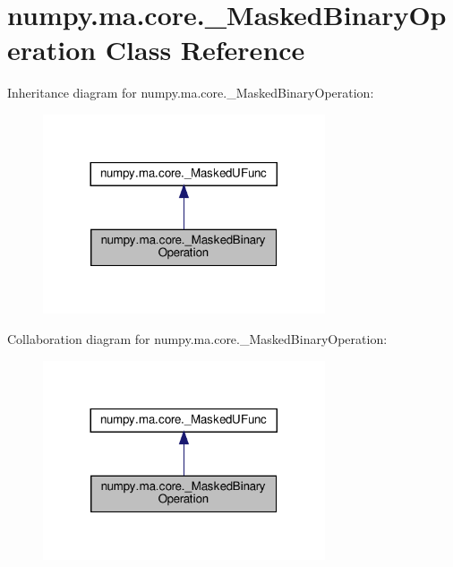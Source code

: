 \hypertarget{classnumpy_1_1ma_1_1core_1_1__MaskedBinaryOperation}{}\section{numpy.\+ma.\+core.\+\_\+\+Masked\+Binary\+Operation Class Reference}
\label{classnumpy_1_1ma_1_1core_1_1__MaskedBinaryOperation}


Inheritance diagram for numpy.\+ma.\+core.\+\_\+\+Masked\+Binary\+Operation\+:
\nopagebreak
\begin{figure}[H]
\begin{center}
\leavevmode
\includegraphics[width=236pt]{classnumpy_1_1ma_1_1core_1_1__MaskedBinaryOperation__inherit__graph}
\end{center}
\end{figure}


Collaboration diagram for numpy.\+ma.\+core.\+\_\+\+Masked\+Binary\+Operation\+:
\nopagebreak
\begin{figure}[H]
\begin{center}
\leavevmode
\includegraphics[width=236pt]{classnumpy_1_1ma_1_1core_1_1__MaskedBinaryOperation__coll__graph}
\end{center}
\end{figure}
